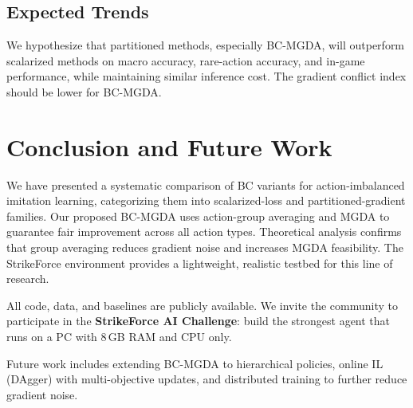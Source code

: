 \documentclass[conference]{IEEEtran}
\begin{document}
\subsection{Expected Trends}
We hypothesize that partitioned methods, especially BC-MGDA, will outperform scalarized methods on macro accuracy, rare-action accuracy, and in-game performance, while maintaining similar inference cost. The gradient conflict index should be lower for BC-MGDA.

\section{Conclusion and Future Work}
We have presented a systematic comparison of BC variants for action-imbalanced imitation learning, categorizing them into scalarized-loss and partitioned-gradient families. Our proposed BC-MGDA uses action-group averaging and MGDA to guarantee fair improvement across all action types. Theoretical analysis confirms that group averaging reduces gradient noise and increases MGDA feasibility. The StrikeForce environment provides a lightweight, realistic testbed for this line of research.

All code, data, and baselines are publicly available. We invite the community to participate in the \textbf{StrikeForce AI Challenge}: build the strongest agent that runs on a PC with 8\,GB RAM and CPU only.

Future work includes extending BC-MGDA to hierarchical policies, online IL (DAgger) with multi-objective updates, and distributed training to further reduce gradient noise.



\end{document}
